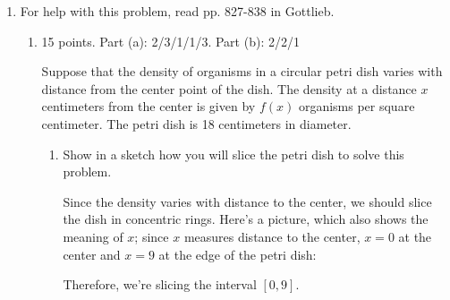 \documentclass{article}
\begin{document}
\begin{enumerate}
\item

For help with this problem, read pp. 827-838 in Gottlieb.

  \begin{enumerate}


  \item
\begin{grading}
    15 points. Part (a): 2/3/1/1/3. Part (b): 2/2/1
\end{grading}
  
  Suppose that the density of organisms in a circular petri dish
    varies with distance from the center point of the dish.  The density
    at a distance $x$ centimeters from the center is given by $f(x)$
    organisms per square centimeter. The petri dish is 18 centimeters in
    diameter.
    \begin{enumerate}
    \item
      \begin{problem}[\stretch{3}]
        Show in a sketch how you will slice the petri dish to solve this
        problem.
      \end{problem}

      \begin{solution}
        Since the density varies with distance to the center, we should
        slice the dish in concentric rings.  Here's a picture, which also
        shows the meaning of $x$; since $x$ measures distance to the
        center, $x = 0$ at the center and $x = 9$ at the edge of the petri
        dish:
        \begin{center}
        \end{center}
        Therefore, we're slicing the interval $[0, 9]$. 
      \end{solution}


\end{enumerate}
\end{enumerate}
\end{enumerate}
\end{document}
